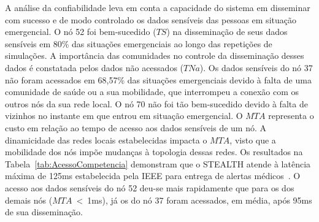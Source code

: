 \documentclass[12pt]{article}
\newcommand{\agn}[1]{\textcolor{auburn}{#1}}
\begin{document}
A análise da confiabilidade leva em conta a capacidade do sistema em disseminar com sucesso e de modo controlado os dados sensíveis das pessoas em situação emergencial. O nó 52 foi bem-sucedido ($TS$) na disseminação de seus dados sensíveis em 80\% das situações emergenciais ao longo das repetições de simulações.
A importância das comunidades no controle da disseminação desses dados é constatada pelos dados não acessados ($TNa$). Os dados sensíveis do nó 37 não foram acessados em 68,57\% das situações emergenciais
\agn{devido}
à falta de uma comunidade de saúde
ou a sua mobilidade, que interrompeu a conexão com os outros nós da sua rede local. O nó 70 não foi tão bem-sucedido
\agn{devido à}
falta de vizinhos no instante em que
entrou em situação emergencial.
O
$MTA$
representa o custo em relação ao tempo de acesso aos dados sensíveis de um nó.
A dinamicidade das redes locais estabelecidas impacta o \textbf{$MTA$}, visto que a mobilidade dos nós impõe mudanças à topologia dessas redes. Os resultados na Tabela~\ref{tab:AcessoCompetencia} demonstram que o \mbox{STEALTH}
\agn{atende}
à latência máxima de 125ms estabelecida pela IEEE para entrega de alertas médicos~\cite{ieee2012}. O acesso aos dados sensíveis do nó 52 deu-se mais rapidamente que para os dos demais nós ($MTA$~<~1ms), já os do nó 37 foram acessados, em média, após 95ms de sua disseminação. 
\end{document}
